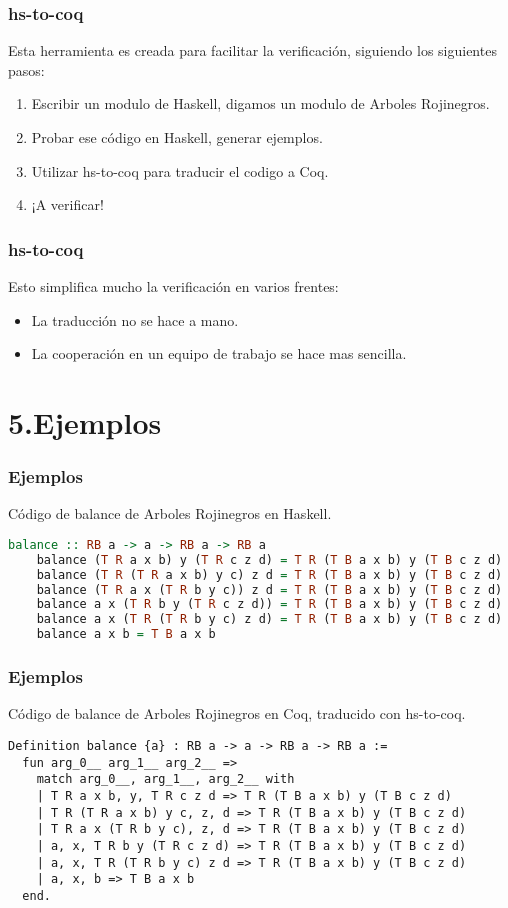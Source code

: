 \documentclass[xcolor=dvipsnames,table,handout]{beamer}
\begin{document}
\begin{frame}
  \frametitle{hs-to-coq}
        Esta herramienta es creada para facilitar la verificación, siguiendo los siguientes pasos:
        \begin{enumerate}
            \item Escribir un modulo de Haskell, digamos un modulo de Arboles Rojinegros.
            \item Probar ese código en Haskell, generar ejemplos.
            \item Utilizar hs-to-coq para traducir el codigo a Coq.
            \item ¡A verificar!
        \end{enumerate}
\end{frame}


\begin{frame}
  \frametitle{hs-to-coq}
        Esto simplifica mucho la verificación en varios frentes:
         \begin{itemize}
            \item La traducción no se hace a mano.
            \item La cooperación en un equipo de trabajo se hace mas sencilla.
        \end{itemize}
\end{frame}
\section{5.Ejemplos}
\begin{frame}[fragile]
  \frametitle{Ejemplos}
  Código de balance de Arboles Rojinegros en Haskell.
       \begin{lstlisting}[language=haskell]
    balance :: RB a -> a -> RB a -> RB a
    balance (T R a x b) y (T R c z d) = T R (T B a x b) y (T B c z d)
    balance (T R (T R a x b) y c) z d = T R (T B a x b) y (T B c z d)
    balance (T R a x (T R b y c)) z d = T R (T B a x b) y (T B c z d)
    balance a x (T R b y (T R c z d)) = T R (T B a x b) y (T B c z d)
    balance a x (T R (T R b y c) z d) = T R (T B a x b) y (T B c z d)
    balance a x b = T B a x b
       \end{lstlisting}
\end{frame}

\begin{frame}[fragile]
  \frametitle{Ejemplos}
  Código de balance de Arboles Rojinegros en Coq, traducido con hs-to-coq.
       \begin{lstlisting}[language=Coq]
 Definition balance {a} : RB a -> a -> RB a -> RB a :=
  fun arg_0__ arg_1__ arg_2__ =>
    match arg_0__, arg_1__, arg_2__ with
    | T R a x b, y, T R c z d => T R (T B a x b) y (T B c z d)
    | T R (T R a x b) y c, z, d => T R (T B a x b) y (T B c z d)
    | T R a x (T R b y c), z, d => T R (T B a x b) y (T B c z d)
    | a, x, T R b y (T R c z d) => T R (T B a x b) y (T B c z d)
    | a, x, T R (T R b y c) z d => T R (T B a x b) y (T B c z d)
    | a, x, b => T B a x b
  end.
       \end{lstlisting}
\end{frame}
\end{document}
